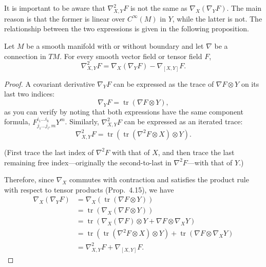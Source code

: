 It is important to be aware that $\nabla^2_{X,Y} F$ is not the same as $\nabla_X (\nabla_Y F)$. The main reason is that the former is linear over $C^\infty(M)$ in $Y$, while the latter is not. The relationship between the two expressions is given in the following proposition.

\begin{proposition}\label{prop:second-covariant-derivative-formula}
Let $M$ be a smooth manifold with or without boundary and let $\nabla$ be a connection in $TM$. For every smooth vector field or tensor field $F$,
\[
\nabla^2_{X,Y} F = \nabla_X (\nabla_Y F) - \nabla_{[X,Y]} F.
\]
\end{proposition}

\begin{proof}
A covariant derivative $\nabla_Y F$ can be expressed as the trace of $\nabla F \otimes Y$ on its last two indices:
\[
\nabla_Y F = \operatorname{tr}(\nabla F \otimes Y),
\]
as you can verify by noting that both expressions have the same component formula, $F^{i_1\ldots i_k}_{j_1 \ldots j_l, m} Y^m$. Similarly, $\nabla^2_{X,Y} F$ can be expressed as an iterated trace:
\[
\nabla^2_{X,Y} F = \operatorname{tr}(\operatorname{tr}(\nabla^2 F \otimes X) \otimes Y).
\]

(First trace the last index of $\nabla^2 F$ with that of $X$, and then trace the last remaining free index---originally the second-to-last in $\nabla^2 F$---with that of $Y$.)

Therefore, since $\nabla_X$ commutes with contraction and satisfies the product rule with respect to tensor products (Prop.\ 4.15), we have
\begin{align*}
\nabla_X (\nabla_Y F) &= \nabla_X (\operatorname{tr}(\nabla F \otimes Y)) \\
&= \operatorname{tr}(\nabla_X (\nabla F \otimes Y)) \\
&= \operatorname{tr}(\nabla_X(\nabla F) \otimes Y + \nabla F \otimes \nabla_X Y) \\
&= \operatorname{tr}(\operatorname{tr}(\nabla^2 F \otimes X) \otimes Y) + \operatorname{tr}(\nabla F \otimes \nabla_X Y) \\
&= \nabla^2_{X,Y} F + \nabla_{[X,Y]} F.
\end{align*}
\end{proof}

